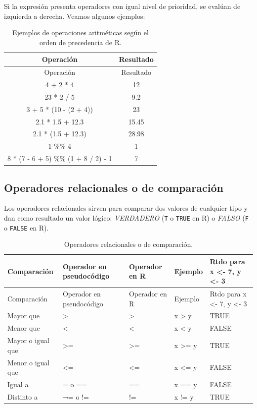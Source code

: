 \documentclass[
]{book}
\begin{document}
Si la expresión presenta operadores con igual nivel de prioridad, se evalúan de izquierda a derecha. Veamos algunos ejemplos:

\begin{longtable}[]{@{}cc@{}}
\caption{\label{tab:ej-op-mat} Ejemplos de operaciones aritméticas según el orden de precedencia de R.}\tabularnewline
\toprule
Operación & Resultado \\
\midrule
\endfirsthead
\toprule
Operación & Resultado \\
\midrule
\endhead
4 + 2 * 4 & 12 \\
23 * 2 / 5 & 9.2 \\
3 + 5 * (10 - (2 + 4)) & 23 \\
2.1 * 1.5 + 12.3 & 15.45 \\
2.1 * (1.5 + 12.3) & 28.98 \\
1 \%\% 4 & 1 \\
8 * (7 - 6 + 5) \%\% (1 + 8 / 2) - 1 & 7 \\
\bottomrule
\end{longtable}

\hypertarget{operadores-relacionales-o-de-comparaciuxf3n}{%
\subsection{Operadores relacionales o de comparación}\label{operadores-relacionales-o-de-comparaciuxf3n}}

Los operadores relacionales sirven para comparar dos valores de cualquier tipo y dan como resultado un valor lógico: \emph{VERDADERO} (\texttt{T} o \texttt{TRUE} en R) o \emph{FALSO} (\texttt{F} o \texttt{FALSE} en R).

\begin{longtable}[]{@{}
  >{\centering\arraybackslash}p{}
  >{\centering\arraybackslash}p{}
  >{\centering\arraybackslash}p{}
  >{\centering\arraybackslash}p{}
  >{\centering\arraybackslash}p{}@{}}
\caption{\label{tab:op-rel} Operadores relacionales o de comparación.}\tabularnewline
\toprule
Comparación & Operador en pseudocódigo & Operador en R & Ejemplo & Rtdo para x \textless- 7, y \textless- 3 \\
\midrule
\endfirsthead
\toprule
Comparación & Operador en pseudocódigo & Operador en R & Ejemplo & Rtdo para x \textless- 7, y \textless- 3 \\
\midrule
\endhead
Mayor que & \textgreater{} & \textgreater{} & x \textgreater{} y & TRUE \\
Menor que & \textless{} & \textless{} & x \textless{} y & FALSE \\
Mayor o igual que & \textgreater= & \textgreater= & x \textgreater= y & TRUE \\
Menor o igual que & \textless= & \textless= & x \textless= y & FALSE \\
Igual a & = o == & == & x == y & FALSE \\
Distinto a & ¬= o != & != & x != y & TRUE \\
\bottomrule
\end{longtable}
\end{document}
